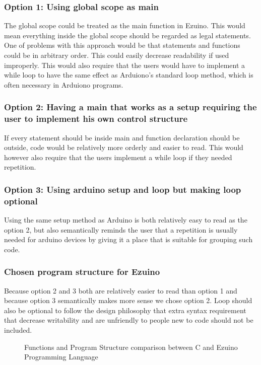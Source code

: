 \subsubsection{Option 1: Using global scope as main}
The global scope could be treated as the main function in Ezuino. This would mean everything inside the global scope should be regarded as legal statements. One of problems with this approach would be that statements and functions could be in arbitrary order. This could easily decrease readability if used improperly.
This would also require that the users would have to implement a while loop to have the same effect as Arduiono's standard loop method, which is often necessary in Arduiono programs. 


\subsubsection{Option 2: Having a main that works as a setup requiring the user to implement his own control structure}
If every statement should be inside main and function declaration should be outside, code would be relatively more orderly and easier to read. 
This would however also require that the users implement a while loop if they needed repetition. 


\subsubsection{Option 3: Using arduino setup and loop but making loop optional}
Using the same setup method as Arduino is both relatively easy to read as the option 2, but also semantically reminds the user that a repetition is usually needed for arduino devices by giving it a place that is suitable for grouping such code.


\subsubsection{Chosen program structure for Ezuino}
Because option 2 and 3 both are relatively easier to read than option 1 and because option 3 semantically makes more sense we chose option 2. Loop should also be optional to follow the design philosophy that extra syntax requirement that decrease writability and are unfriendly to people new to code should not be included. 
\begin{figure}[H]
\centering
{}
\caption{Functions and Program Structure comparison between C and Ezuino Programming Language}
\label{lf10}
\end{figure}

